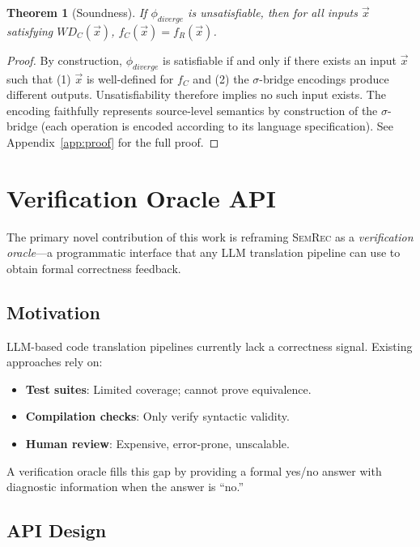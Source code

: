 \documentclass[10pt,letterpaper]{article}
\newtheorem{theorem}{Theorem}
\begin{document}
\begin{theorem}[Soundness]
\label{thm:soundness}
If $\phi_{\mathit{diverge}}$ is unsatisfiable, then for all inputs $\vec{x}$
satisfying $\mathit{WD}_C(\vec{x})$, $f_C(\vec{x}) = f_R(\vec{x})$.
\end{theorem}

\begin{proof}
By construction, $\phi_{\mathit{diverge}}$ is satisfiable if and only if there
exists an input $\vec{x}$ such that (1) $\vec{x}$ is well-defined for $f_C$ and
(2) the $\sigma$-bridge encodings produce different outputs. Unsatisfiability
therefore implies no such input exists. The encoding faithfully represents
source-level semantics by construction of the $\sigma$-bridge (each operation is
encoded according to its language specification). See Appendix~\ref{app:proof}
for the full proof.
\end{proof}

\section{Verification Oracle API}
\label{sec:oracle}

The primary novel contribution of this work is reframing \textsc{SemRec} as a
\emph{verification oracle}---a programmatic interface that any LLM translation
pipeline can use to obtain formal correctness feedback.

\subsection{Motivation}

LLM-based code translation pipelines currently lack a correctness signal. Existing
approaches rely on:
\begin{itemize}[itemsep=1pt]
\item \textbf{Test suites}: Limited coverage; cannot prove equivalence.
\item \textbf{Compilation checks}: Only verify syntactic validity.
\item \textbf{Human review}: Expensive, error-prone, unscalable.
\end{itemize}

A verification oracle fills this gap by providing a formal yes/no answer with
diagnostic information when the answer is ``no.''

\subsection{API Design}
\end{document}
